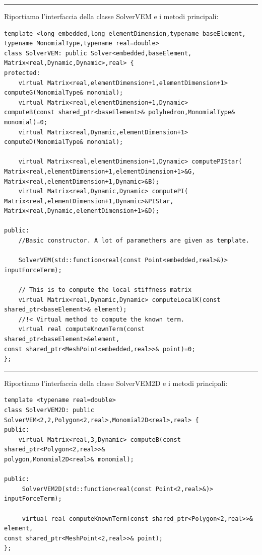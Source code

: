 \documentclass[oneside,12pt]{book}  %
\theoremstyle{plain}
\theoremstyle{definition}
\theoremstyle{remark}
\numberwithin{equation}{chapter} %
\begin{document}
\noindent\rule{14cm}{1pt}

Riportiamo l'interfaccia della classe SolverVEM e i metodi principali:

\begin{verbatim}
template <long embedded,long elementDimension,typename baseElement,
typename MonomialType,typename real=double>
class SolverVEM: public Solver<embedded,baseElement,
Matrix<real,Dynamic,Dynamic>,real> {
protected:
    virtual Matrix<real,elementDimension+1,elementDimension+1> 
computeG(MonomialType& monomial);
    virtual Matrix<real,elementDimension+1,Dynamic> 
computeB(const shared_ptr<baseElement>& polyhedron,MonomialType& monomial)=0;
    virtual Matrix<real,Dynamic,elementDimension+1> 
computeD(MonomialType& monomial);
	
    virtual Matrix<real,elementDimension+1,Dynamic> computePIStar(
Matrix<real,elementDimension+1,elementDimension+1>&G,
Matrix<real,elementDimension+1,Dynamic>&B);
    virtual Matrix<real,Dynamic,Dynamic> computePI(
Matrix<real,elementDimension+1,Dynamic>&PIStar,
Matrix<real,Dynamic,elementDimension+1>&D);
	
public:
    //Basic constructor. A lot of paramethers are given as template.

    SolverVEM(std::function<real(const Point<embedded,real>&)> inputForceTerm);
	
    // This is to compute the local stiffness matrix
    virtual Matrix<real,Dynamic,Dynamic> computeLocalK(const
shared_ptr<baseElement>& element); 
    //!< Virtual method to compute the known term.
    virtual real computeKnownTerm(const shared_ptr<baseElement>&element, 
const shared_ptr<MeshPoint<embedded,real>>& point)=0; 
};

\end{verbatim}

\noindent\rule{14cm}{1pt}

Riportiamo l'interfaccia della classe SolverVEM2D e i metodi principali:

\begin{verbatim}
template <typename real=double>
class SolverVEM2D: public SolverVEM<2,2,Polygon<2,real>,Monomial2D<real>,real> {
public:
    virtual Matrix<real,3,Dynamic> computeB(const shared_ptr<Polygon<2,real>>&
polygon,Monomial2D<real>& monomial);

public:
     SolverVEM2D(std::function<real(const Point<2,real>&)> inputForceTerm);
    
     virtual real computeKnownTerm(const shared_ptr<Polygon<2,real>>& element,
const shared_ptr<MeshPoint<2,real>>& point);
};
\end{verbatim}
\end{document}
